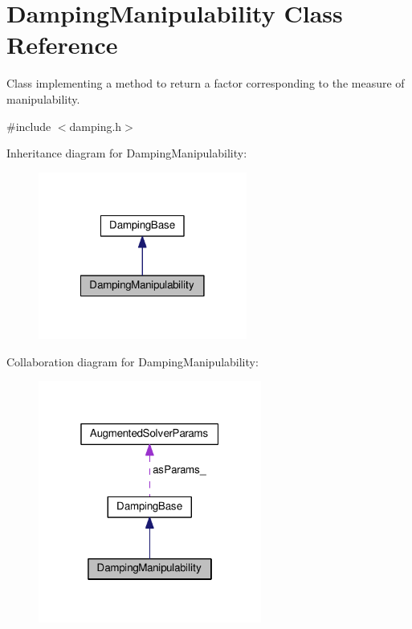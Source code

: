 \hypertarget{classDampingManipulability}{\section{Damping\-Manipulability Class Reference}
\label{classDampingManipulability}
}


Class implementing a method to return a factor corresponding to the measure of manipulability.  




{\ttfamily \#include $<$damping.\-h$>$}



Inheritance diagram for Damping\-Manipulability\-:
\nopagebreak
\begin{figure}[H]
\begin{center}
\leavevmode
\includegraphics[width=194pt]{classDampingManipulability__inherit__graph}
\end{center}
\end{figure}


Collaboration diagram for Damping\-Manipulability\-:
\nopagebreak
\begin{figure}[H]
\begin{center}
\leavevmode
\includegraphics[width=208pt]{classDampingManipulability__coll__graph}
\end{center}
\end{figure}
